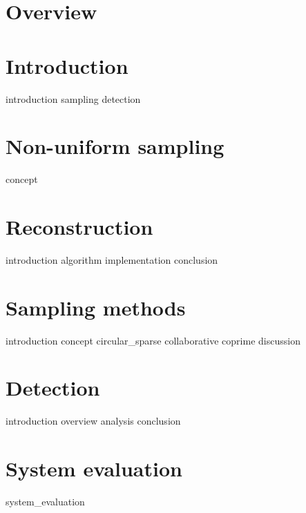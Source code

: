 \documentclass[a4paper, openany, oneside]{memoir}
\begin{document}
\chapter{Overview}

\chapter{Introduction}
\label{cha:overview}
{introduction}
{sampling}
{detection}

\chapter{Non-uniform sampling}
\label{cha:sampling}
{concept}

\chapter{Reconstruction}
\label{cha:reconstruction}
{introduction}
{algorithm}
{implementation}
{conclusion}

\chapter{Sampling methods}
\label{cha:sampling_methods}
{introduction}
{concept}
{circular_sparse}
{collaborative}
{coprime}
{discussion}

\chapter{Detection}
\label{cha:detection}
{introduction}
{overview}
{analysis}
{conclusion}

\chapter{System evaluation}
\label{cha:system_evaluation_theory}
{system_evaluation}
\end{document}
